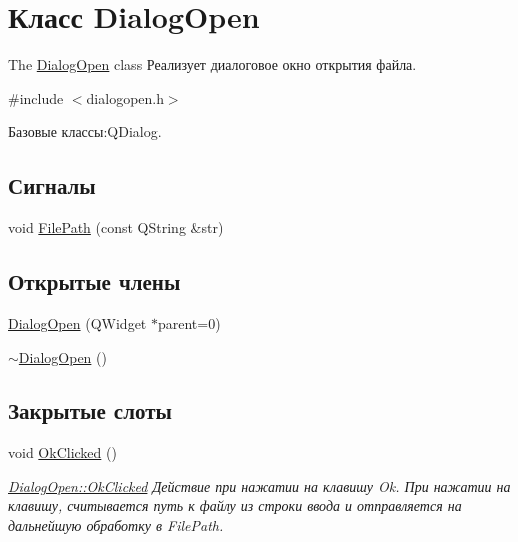 \hypertarget{class_dialog_open}{\section{Класс Dialog\+Open}
\label{class_dialog_open}
}


The \hyperlink{class_dialog_open}{Dialog\+Open} class Реализует диалоговое окно открытия файла.  




{\ttfamily \#include $<$dialogopen.\+h$>$}



Базовые классы\+:Q\+Dialog.

\subsection*{Сигналы}
\begin{DoxyCompactItemize}
\item 
void \hyperlink{class_dialog_open_a6182df6b0fddf9bae1e44d8af4c2d6e6}{File\+Path} (const Q\+String \&str)
\end{DoxyCompactItemize}
\subsection*{Открытые члены}
\begin{DoxyCompactItemize}
\item 
\hyperlink{class_dialog_open_a030f07ac6144177ef90830de306810f4}{Dialog\+Open} (Q\+Widget $\ast$parent=0)
\item 
\hyperlink{class_dialog_open_a635ed5242a5f2a6c88d736c3742bd7d2}{$\sim$\+Dialog\+Open} ()
\end{DoxyCompactItemize}
\subsection*{Закрытые слоты}
\begin{DoxyCompactItemize}
\item 
void \hyperlink{class_dialog_open_adbe6cc3198d1caabd959554d1d61b5de}{Ok\+Clicked} ()
\begin{DoxyCompactList}\small\item\em \hyperlink{class_dialog_open_adbe6cc3198d1caabd959554d1d61b5de}{Dialog\+Open\+::\+Ok\+Clicked} Действие при нажатии на клавишу Ok. При нажатии на клавишу, считывается путь к файлу из строки ввода и отправляется на дальнейшую обработку в File\+Path. \end{DoxyCompactList}\end{DoxyCompactItemize}
